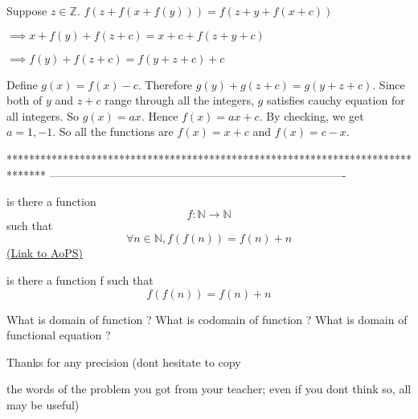 \begin{solution}
	Suppose $z\in \mathbb Z$.
$f(z+f(x+f(y)))=f(z+y+f(x+c))$

$\implies x+f(y)+f(z+c)=x+c+f(z+y+c)$

$\implies f(y)+f(z+c)=f(y+z+c)+c$

Define $g(x)=f(x)-c$. Therefore $g(y)+g(z+c)=g(y+z+c)$. Since both of $y$ and $z+c$ range through all the integers, $g$ satisfies cauchy equation for all integers. So $g(x)=ax$. Hence $f(x)=ax+c$. By checking, we get $a=1,-1$. So all the functions are $f(x)=x+c$ and $f(x)=c-x$.
\end{solution}
*******************************************************************************
-------------------------------------------------------------------------------

\begin{problem}
	is there a function \[f:\mathbb{N}\rightarrow \mathbb{N}\]
 such that
\[\forall n\in \mathbb{N},f(f(n))=f(n)+n\]
	\flushright \href{https://artofproblemsolving.com/community/c6h570932}{(Link to AoPS)}
\end{problem}



\begin{solution}
	\begin{tcolorbox}is there a function f such that
\[f(f(n))=f(n)+n\]\end{tcolorbox}
What is domain of function ?
What is codomain of function ?
What is domain of functional equation ?

Thanks for any precision (dont hesitate to copy the words of the problem you got from your teacher; even if you dont think so, all may be useful)
\end{solution}






